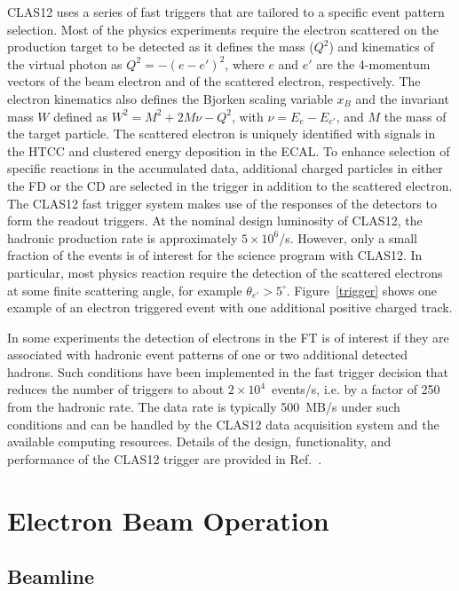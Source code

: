 \documentclass[final,3p,twocolumn]{elsarticle}
\begin{document}
CLAS12 uses a series of fast triggers that are tailored to a specific event pattern selection. Most of the physics
experiments require the electron scattered on the production target to be detected as it defines the mass
($Q^2$) and kinematics of the virtual photon as $Q^2 = -(e - e')^2$, where $e$ and $e'$ are the 4-momentum
vectors of the beam electron and of the scattered electron, respectively. The electron kinematics also defines
the Bjorken scaling variable $x_B$  and the invariant mass $W$ defined as $W^2 = M^2 + 2M\nu - Q^2$, with
$\nu = E_e - E_{e'}$, and $M$ the mass of the target particle. The scattered electron is uniquely identified with
signals in the HTCC and clustered energy deposition in the ECAL. To enhance selection of specific reactions in the
accumulated data, additional charged particles in either the FD or the CD are selected in the trigger in addition to
the scattered electron. The CLAS12 fast trigger system makes use of the responses of the detectors to form the
readout triggers. At the nominal design luminosity of CLAS12, the hadronic production rate is approximately
$5 \times 10^6$/s. However, only a small fraction of the events is of interest for the science program with
CLAS12. In particular, most physics reaction require the detection of the scattered electrons at some finite
scattering angle, for example $\theta_{e'} > 5^\circ$.  Figure~\ref{trigger} shows one example of an electron
triggered event with one additional positive charged track.   
   
In some experiments the detection of electrons in the FT is of interest if they are associated with hadronic
event patterns of one or two additional detected hadrons. Such conditions have been implemented in the fast trigger
decision that reduces the number of triggers to about $2 \times 10^4$~events/s, i.e. by  a factor of 250 from the
hadronic rate. The data rate is typically 500~MB/s under such conditions and can be handled by the CLAS12 data
acquisition system and the available computing resources. Details of the design, functionality, and performance of
the CLAS12 trigger are provided in Ref.~\cite{TRIG}. 

\section{Electron Beam Operation} 

\subsection{Beamline}
\end{document}
